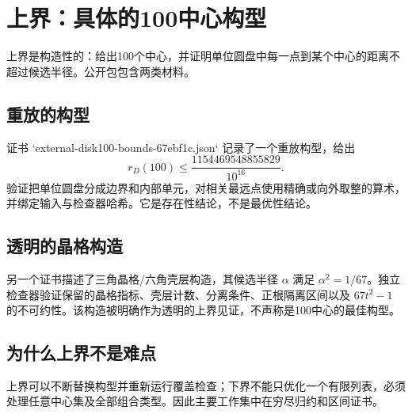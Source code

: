 \section{上界：具体的100中心构型}
上界是构造性的：给出100个中心，并证明单位圆盘中每一点到某个中心的距离不超过候选半径。公开包包含两类材料。

\subsection{重放的构型}
证书 `external-disk100-bounds-67ebf1c.json` 记录了一个重放构型，给出
\[
r_D(100)\le \frac{1154469548855829}{10^{16}}.
\]
验证把单位圆盘分成边界和内部单元，对相关最远点使用精确或向外取整的算术，并绑定输入与检查器哈希。它是存在性结论，不是最优性结论。

\subsection{透明的晶格构造}
另一个证书描述了三角晶格/六角壳层构造，其候选半径 $\alpha$ 满足 $\alpha^2=1/67$。独立检查器验证保留的晶格指标、壳层计数、分离条件、正根隔离区间以及 $67t^2-1$ 的不可约性。该构造被明确作为透明的上界见证，不声称是100中心的最佳构型。

\subsection{为什么上界不是难点}
上界可以不断替换构型并重新运行覆盖检查；下界不能只优化一个有限列表，必须处理任意中心集及全部组合类型。因此主要工作集中在穷尽归约和区间证书。
